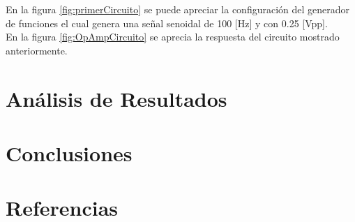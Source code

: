 \documentclass[]{article}
\begin{document}
En la figura \ref{fig:primerCircuito} se puede apreciar la configuración del generador de funciones el cual genera una señal senoidal de 100 [Hz] y con 0.25 [Vpp].\\



En la figura \ref{fig:OpAmpCircuito} se aprecia la respuesta del circuito mostrado anteriormente.\\







\section{Análisis de Resultados}



\section{Conclusiones}


\section{Referencias}



\end{document}
